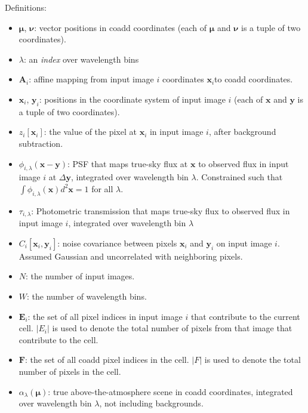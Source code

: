 \documentclass[DM,authoryear,toc]{lsstdoc}
\begin{document}
Definitions:
\begin{itemize}
\item $\bm{\mu}$, $\bm{\nu}$: vector positions in coadd coordinates (each of $\bm{\mu}$ and $\bm{\nu}$ is a tuple of two coordinates).
\item $\lambda$: an \emph{index} over wavelength bins
\item $\bm{A}_i$: affine mapping from input image $i$ coordinates $\bm{x}_i$to coadd coordinates.
\item $\bm{x}_{i}$, $\bm{y}_i$: positions in the coordinate system of input image $i$ (each of $\bm{x}$ and $\bm{y}$ is a tuple of two coordinates).
\item $z_{i}[\bm{x}_i]$: the value of the pixel at $\bm{x}_i$ in input image $i$, after background subtraction.
\item $\phi_{i,\lambda}(\bm{x}-\bm{y})$: PSF that maps true-sky flux at $\bm{x}$ to observed flux in input image $i$ at $\Delta\bm{y}$, integrated over wavelength bin $\lambda$.  Constrained such that
$\int \phi_{i,\lambda}(\bm{x}) d^2\bm{x} = 1$ for all $\lambda$.
\item $\tau_{i,\lambda}$: Photometric transmission that maps true-sky flux to observed flux in input image $i$, integrated over wavelength bin $\lambda$
\item $C_{i}[\bm{x}_i, \bm{y}_i]$: noise covariance between pixels $\bm{x}_i$ and $\bm{y}_i$ on input image $i$.  Assumed Gaussian and uncorrelated with neighboring pixels.
\item $N$: the number of input images.
\item $W$: the number of wavelength bins.
\item $\bm{E}_i$: the set of all pixel indices in input image $i$ that contribute to the current cell.  $|E_i|$ is used to denote the total number of pixels from that image that contribute to the cell.
\item $\bm{F}$: the set of all coadd pixel indices in the cell.  $|F|$ is used to denote the total number of pixels in the cell.
\item $\alpha_{\lambda}(\bm{\mu})$: true above-the-atmosphere scene in coadd coordinates, integrated over wavelength bin $\lambda$, not including backgrounds.
\end{itemize}
\end{document}
